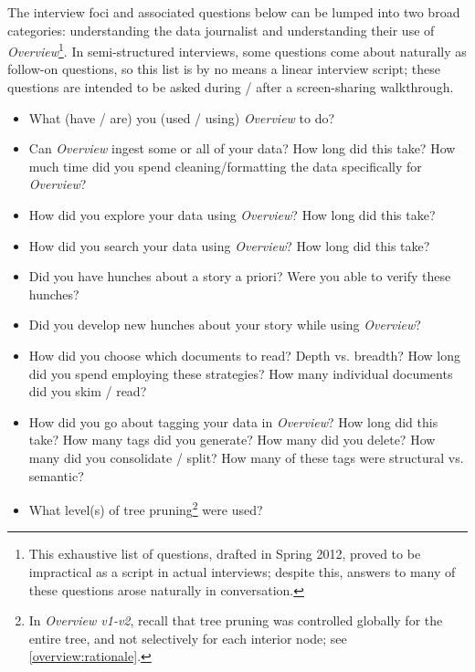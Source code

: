 The interview foci and associated questions below can be lumped into two broad categories: understanding the data journalist and understanding their use of {\it Overview}\footnote{This exhaustive list of questions, drafted in Spring 2012, proved to be impractical as a script in actual interviews; despite this, answers to many of these questions arose naturally in conversation.}. 
In semi-structured interviews, some questions come about naturally as follow-on questions, so this list is by no means a linear interview script; these questions are intended to be asked during / after a screen-sharing walkthrough.


\begin{itemize}
    \item What (have / are) you (used / using) {\it Overview} to do?
    \item Can {\it Overview} ingest some or all of your data? How long did this take? How much time did you spend cleaning/formatting the data specifically for {\it Overview}?
    \item How did you explore your data using {\it Overview}? How long did this take?
    \item How did you search your data using {\it Overview}? How long did this take?
    \item Did you have hunches about a story a priori? Were you able to verify these hunches?
    \item Did you develop new hunches about your story while using {\it Overview}?
    \item How did you choose which documents to read? Depth vs. breadth? How long did you spend employing these strategies? How many individual documents did you skim / read?
    \item How did you go about tagging your data in {\it Overview}? How long did this take? How many tags did you generate? How many did you delete? How many did you consolidate / split? How many of these tags were structural vs. semantic?
    \item What level(s) of tree pruning\footnote{In {\it Overview v1-v2}, recall that tree pruning was controlled globally for the entire tree, and not selectively for each interior node; see \autoref{overview:rationale}.} were used? 

\end{itemize}
